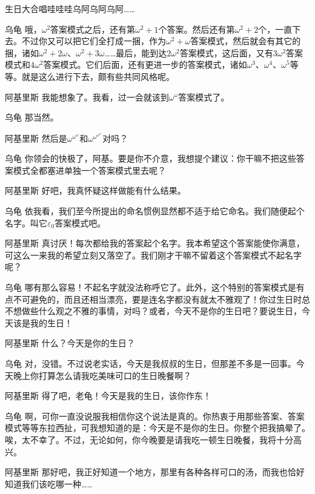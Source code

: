 \begin{dialog}{生日大合唱哇哇哇乌阿乌阿乌阿……}
\begin{dialogue}
\item[乌龟]哦，$\omega^2$答案模式之后，还有第$\omega^2+1$个答案。然后还有第$\omega^2+2$个，一直下去。不过你又可以把它们全打成一捆，作为$\omega^2+\omega$答案模式，然后就会有其它的捆，诸如$\omega^2+2\omega$、$\omega^2+3\omega$……最后，能到达$2\omega^2$答案模式，这后面，又有$3\omega^2$答案模式和$4\omega^2$答案模式。它们后面，还有更进一步的答案模式，诸如$\omega^3$、$\omega^4$、$\omega^5$等等。就是这么进行下去，颇有些共同风格呢。

\item[阿基里斯]我能想象了。我看，过一会就该到$\omega^\omega$答案模式了。

\item[乌龟]那当然。

\item[阿基里斯]然后是$\omega^{\omega^\omega}$和$\omega^{\omega^{\omega^\omega}}$对吗？

\item[乌龟]你领会的快极了，阿基。要是你不介意，我想提个建议：你干嘛不把这些答案模式全都塞进单独一个答案模式里去呢？

\item[阿基里斯]好吧，我真怀疑这样做能有什么结果。

\item[乌龟]依我看，我们至今所提出的命名惯例显然都不适于给它命名。我们随便起个名字。叫它$\varepsilon_0$答案模式吧。

\item[阿基里斯]真讨厌！每次都给我的答案起个名字。我本希望这个答案能使你满意，可这么一来我的希望立刻又落空了。我们刚才干嘛不留着这个答案模式不起名字呢？

\item[乌龟]哪有那么容易！不起名字就没法称呼它了。此外，这个特别的答案模式是有点不可避免的，而且还相当漂亮，要是连名字都没有就太不雅观了！你过生日时总不想做些什么观之不雅的事情，对吗？或者，今天不是你的生日吧？要说生日，今天该是我的生日！

\item[阿基里斯]什么？今天是你的生日？

\item[乌龟]对，没错。不过说老实话，今天是我叔叔的生日，但那差不多是一回事。今天晚上你打算怎么请我吃美味可口的生日晚餐啊？

\item[阿基里斯]得了吧，老龟！今天是我的生日，该你作东！

\item[乌龟]啊，可你一直没说服我相信你这个说法是真的。你热衷于用那些答案、答案模式等等东拉西扯，可我想知道的是：今天是不是你的生日。你整个把我搞晕了。唉，太不幸了。不过，无论如何，你今晚要是请我吃一顿生日晚餐，我将十分高兴。

\item[阿基里斯]那好吧，我正好知道一个地方，那里有各种各样可口的汤，而我也恰好知道我们该吃哪一种……

\end{dialogue}

\end{dialog}
